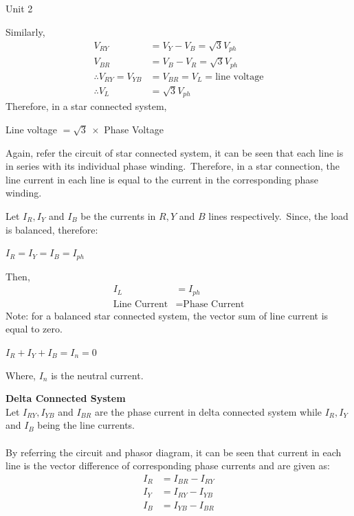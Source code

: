 \documentclass[11pt]{beamer}
\begin{document}
\begin{frame}[t,allowframebreaks]{Unit 2}
        \framebreak

        Similarly,
        \begin{align*}
            V_{RY} &= V_Y - V_B = \sqrt{3} V_{ph}\\
            V_{BR} &= V_B - V_R = \sqrt{3} V_{ph}\\
            \therefore V_{RY} = V_{YB} &= V_{BR} = V_{L} = \text{line voltage}\\
            \therefore V_{L} &= \sqrt {3} V_{ph}
        \end{align*}
        Therefore, in a star connected system,
        \begin{center}
            Line voltage $= \sqrt {3}~\times$ Phase Voltage
        \end{center}
        Again, refer the circuit of star connected system, it can be seen that each line is in series with its
        individual phase winding.\ Therefore, in a star connection, the line current in each line is equal to the
        current in the corresponding phase winding.

        \framebreak

        Let $I_R, I_Y$ and $I_B$ be the currents in $R, Y$ and $B$ lines respectively.\ Since, the load is balanced,
        therefore:
        \begin{center}
            $I_R = I_Y = I_B = I_{ph}$
        \end{center}
        Then,
        \begin{align*}
            I_L &= I_{ph}\\
            \text{Line Current} &= \text{Phase Current}
        \end{align*}
        Note: for a balanced star connected system, the vector sum of line current is equal to zero.
        \begin{center}
            $I_R + I_Y + I_B = I_n = 0$
        \end{center}
        Where, $I_n$ is the neutral current.

        \framebreak

        \textbf{Delta Connected System}\\[10pt]

        Let $I_{RY}, I_{YB}$ and $I_{BR}$ are the phase current in delta connected system while $I_R, I_Y$ and $I_B$
        being the line currents.
        \\~\\
        By referring the circuit and phasor diagram, it can be seen that current in each line is the vector
        difference of corresponding phase currents and are given as:
        \begin{align*}
            I_R &= I_{BR} - I_{RY}\\
            I_Y &= I_{RY} - I_{YB}\\
            I_B &= I_{YB} - I_{BR}
        \end{align*}


\end{frame}
\end{document}
